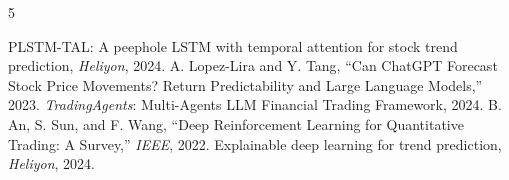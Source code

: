 \documentclass[10pt,conference]{IEEEtran}
\begin{document}
\balance
\begin{thebibliography}{5}

 PLSTM-TAL: A peephole LSTM with temporal attention for stock trend prediction, \textit{Heliyon}, 2024.
 A. Lopez-Lira and Y. Tang, ``Can ChatGPT Forecast Stock Price Movements? Return Predictability and Large Language Models,'' 2023.
 \textit{TradingAgents}: Multi-Agents LLM Financial Trading Framework, 2024.
 B. An, S. Sun, and F. Wang, ``Deep Reinforcement Learning for Quantitative Trading: A Survey,'' \textit{IEEE}, 2022.
 Explainable deep learning for trend prediction, \textit{Heliyon}, 2024.
\end{thebibliography}
\end{document}
